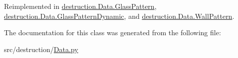 Reimplemented in \hyperlink{classdestruction_1_1_data_1_1_glass_pattern_ad2fe0a72cee46d5f3dd9ba8890490e45}{destruction.\-Data.\-Glass\-Pattern}, \hyperlink{classdestruction_1_1_data_1_1_glass_pattern_dynamic_a0e2482db7d3977e0de50c222acc15acd}{destruction.\-Data.\-Glass\-Pattern\-Dynamic}, and \hyperlink{classdestruction_1_1_data_1_1_wall_pattern_afeeefce0b575dcb3e7da763ba02c36db}{destruction.\-Data.\-Wall\-Pattern}.



The documentation for this class was generated from the following file\-:\begin{DoxyCompactItemize}
\item 
src/destruction/\hyperlink{_data_8py}{Data.\-py}\end{DoxyCompactItemize}
